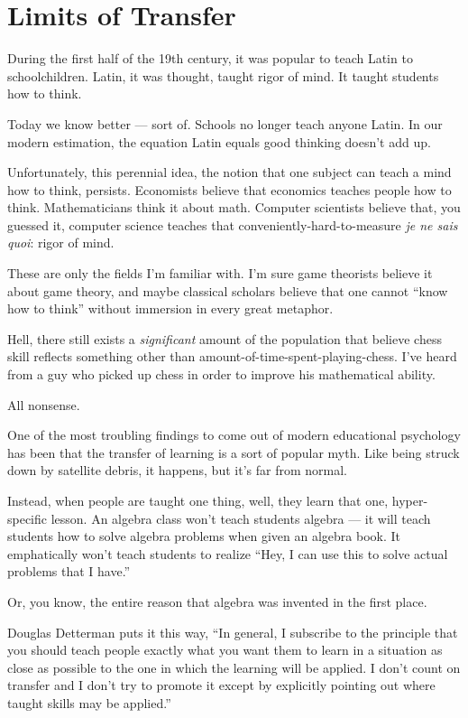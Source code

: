 \section{Limits of Transfer}

During the first half of the 19th century, it was popular to teach Latin to
schoolchildren. Latin, it was thought, taught rigor of mind. It taught
students how to think.

Today we know better --- sort of. Schools no longer teach anyone Latin. In our
modern estimation, the equation Latin equals good thinking doesn't add up. 

Unfortunately, this perennial idea, the notion that one subject can teach a mind
how to think, persists. Economists believe that economics teaches people how to
think. Mathematicians think it about math. Computer scientists believe that, you
guessed it, computer science teaches that conveniently-hard-to-measure
\textit{je ne sais quoi}: rigor of mind.

These are only the fields I'm familiar with. I'm sure game theorists believe it
about game theory, and maybe classical scholars believe that one cannot ``know
how to think'' without immersion in every great metaphor.

Hell, there still exists a \textit{significant} amount of the population that
believe chess skill reflects something other than
amount-of-time-spent-playing-chess. I've heard from a guy who picked up chess in
order to improve his mathematical ability.

All nonsense.

One of the most troubling findings to come out of modern educational psychology has been that the transfer of learning is a sort
of popular myth. Like being struck down by satellite debris, it happens, but it's far from normal.

Instead, when people are taught one thing, well, they learn that one,
hyper-specific lesson. An algebra class won't teach students algebra --- it will
teach students how to solve algebra problems when given an algebra book. It
emphatically won't teach students to realize ``Hey, I can use this to solve
actual problems that I have.''

Or, you know, the entire reason that algebra was invented in the first place.

Douglas Detterman puts it this way, ``In general, I subscribe to the principle
that you should teach people exactly what you want them to learn in a situation
as close as possible to the one in which the learning will be applied.  I don't
count on transfer and I don't try to promote it except by explicitly pointing
out where taught skills may be applied.''

